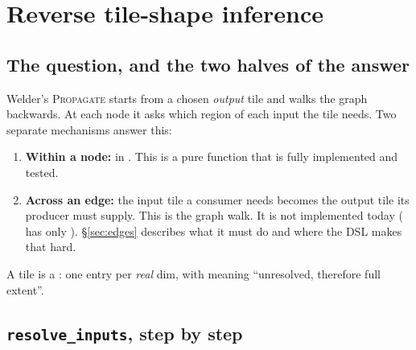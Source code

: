 \section{Reverse tile-shape inference}
\label{sec:inference}

\subsection{The question, and the two halves of the answer}

Welder's \textsc{Propagate} starts from a chosen \emph{output} tile and walks the
graph backwards. At each node it asks which region of each input the tile needs.
Two separate mechanisms answer this:

\begin{enumerate}
\item \textbf{Within a node:}  in
  . This is a pure function
  that is fully implemented and tested.
\item \textbf{Across an edge:} the input tile a consumer needs becomes the output
  tile its producer must supply. This is the graph walk. It is not implemented
  today ( has only ). \S\ref{sec:edges} describes what
  it must do and where the DSL makes that hard.
\end{enumerate}

A tile is a : one entry per \emph{real} dim,
with  meaning ``unresolved, therefore full extent''.

\subsection{\texttt{resolve\_inputs}, step by step}

